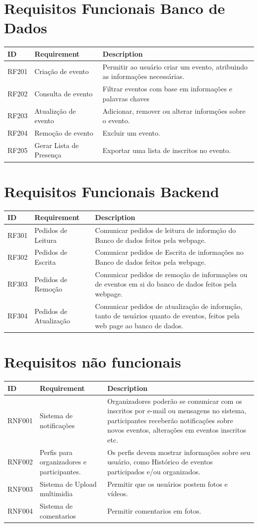 \section{Requisitos Funcionais Banco de Dados}
\begin{tabular}{>{\raggedright}p{1.5cm}>{\raggedright}p{4cm}>{\raggedright}p{10cm}}
\toprule
\textbf{ID} & \textbf{Requirement} & \textbf{Description} \tabularnewline 
\midrule
  RF201 & Criação de evento & Permitir ao usuário criar um evento, atribuindo as informações necessárias.\tabularnewline \hline
  RF202 & Consulta de evento & Filtrar eventos com base em informações e palavras chaves\tabularnewline \hline
  RF203 & Atualizção de evento & Adicionar, remover ou alterar informções sobre o evento.\tabularnewline \hline
  RF204 & Remoção de evento & Excluir um evento.\tabularnewline \hline
  RF205 & Gerar Lista de Presença & Exportar uma lista de inscritos no evento.\tabularnewline 
\bottomrule
\end{tabular}

\section{Requisitos Funcionais Backend}

\begin{tabular}{>{\raggedright}p{1.5cm}>{\raggedright}p{4cm}>{\raggedright}p{10cm}}
\toprule
\textbf{ID} & \textbf{Requirement} & \textbf{Description} \tabularnewline 
\midrule
  RF301 & Pedidos de Leitura & Comunicar pedidos de leitura de informção do Banco de dados feitos pela webpage. \tabularnewline \hline
  RF302 & Pedidos de Escrita & Comunicar pedidos de Escrita de informações no Banco de dados feitos pela webpage.\tabularnewline \hline
  RF303 & Pedidos de Remoção & Comunicar pedidos de remoção de informações ou de eventos em si do banco de dados feitos pela webpage.\tabularnewline \hline
  RF304 & Pedidos de Atualização & Comunicar pedidos de atualização de informção, tanto de usuários quanto de eventos, feitos pela web page ao banco de dados.\tabularnewline 
\bottomrule
\end{tabular}


\section{Requisitos não funcionais}
\begin{tabular}{>{\raggedright}p{1.5cm}>{\raggedright}p{4cm}>{\raggedright}p{10cm}}
\toprule
\textbf{ID} & \textbf{Requirement} & \textbf{Description} \tabularnewline 
\midrule
RNF001 & Sistema de notificações & Organizadores poderão se comunicar com os inscritos por e-mail ou mensagens no sistema, participantes receberão notiﬁcações sobre novos eventos, alterações em eventos inscritos etc. \tabularnewline \hline
RNF002 & Perﬁs para organizadores e participantes. & Os perfis devem mostrar informações sobre seu usuário, como Histórico de eventos participados e/ou organizados. \tabularnewline \hline
RNF003 & Sistema de Upload multimidia & Permitir que os usuários postem fotos e vídeos. \tabularnewline \hline 
RNF004 & Sistema de comentarios & Permitir comentarios em fotos.\tabularnewline

\bottomrule
\end{tabular}


